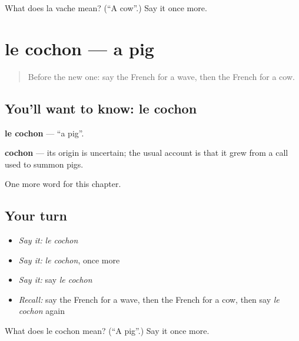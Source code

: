 \begin{tcolorbox}[breakable,colback=teal!4,colframe=teal!35!black,title={Before you move on}]
What does la vache mean? (\textquotedblleft{}A cow\textquotedblright{}.) Say it once more.
\end{tcolorbox}
\section[le cochon]{le cochon — a pig}

\label{lesson:FR-C85-cochon}



\begin{quote}
Before the new one: say the French for a wave, then the French for a cow.
\end{quote}

\subsection*{You'll want to know: le cochon}
\textbf{le cochon} — \textquotedblleft{}a pig\textquotedblright{}.

\begin{cousinweb}
\textbf{cochon} — its origin is uncertain; the usual account is that it grew from a call used to summon pigs.
\end{cousinweb}

\begin{grammarlens}[title={What you've built}]
One more word for this chapter.
\end{grammarlens}

\subsection*{Your turn}
\begin{itemize}
\raggedright
  \item \emph{Say it:} \emph{le cochon}
  \item \emph{Say it:} \emph{le cochon}, once more
  \item \emph{Say it:} say \emph{le cochon}
  \item \emph{Recall:} say the French for a wave, then the French for a cow, then say \emph{le cochon} again
\end{itemize}

\begin{tcolorbox}[breakable,colback=teal!4,colframe=teal!35!black,title={Before you move on}]
What does le cochon mean? (\textquotedblleft{}A pig\textquotedblright{}.) Say it once more.
\end{tcolorbox}

